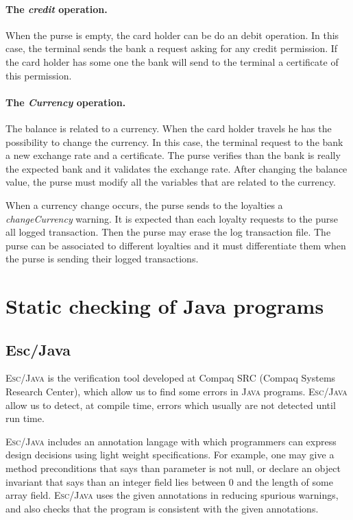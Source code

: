 \documentclass[a4paper]{llncs}
\begin{document}
\paragraph{The \textit{credit} operation.} When the purse is empty, the 
card holder can be do an debit operation. In this case, the terminal
sends the bank a request asking for any credit permission. If the card 
holder has some one the bank will send to the terminal a certificate of 
this permission. 



\paragraph{The \textit{Currency} operation.} The balance is related to a
currency. When the card holder travels he has the possibility to
change the currency. In this case, the terminal request to the bank a
new exchange rate and a certificate. The purse verifies than the bank is 
really the expected bank and it validates the exchange rate. After
changing the balance value, the purse must modify all the variables
that are related to the currency. 

When a currency change occurs, the purse sends to the loyalties a
\textit{changeCurrency} warning. It is expected than each loyalty
requests to the purse all logged transaction.  Then the purse may erase 
the log transaction file. The purse can be associated to different
loyalties and it must differentiate them when the purse is sending
their logged transactions. 






\section{Static checking of Java programs}
\label{SectStatic}


\subsection{\sc Esc/Java}
\label{SubSectEscJava}
\textsc{Esc/Java} is the verification tool developed at
Compaq SRC (Compaq Systems Research Center), which allow us to find
some errors in \textsc{Java} programs. \textsc{Esc/Java} allow us to
detect, at compile time, errors which usually are not detected until
run time. 

\textsc{Esc/Java} includes an annotation langage with which
programmers can express design decisions using light weight
specifications. For example, one may give a method preconditions that
says than parameter is not null, or declare an object invariant that
says than an integer field lies between $0$ and the length of some
array field. \textsc{Esc/Java} uses the given annotations in reducing
spurious warnings, and also checks that the program is consistent with 
the given annotations. 
\end{document}

